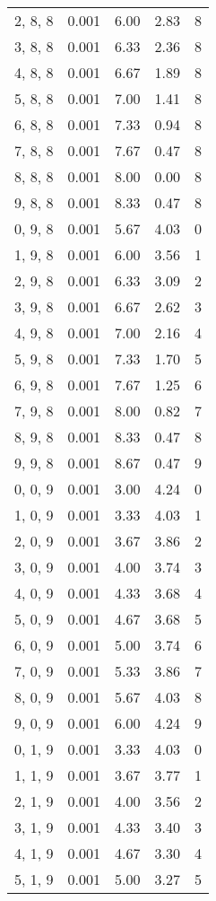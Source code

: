 \documentclass[12pt]{article}
\begin{document}
\begin{tabular}{c || c || c | c | c}
2, 8, 8 & 0.001 & 6.00 & 2.83 & 8 \\
3, 8, 8 & 0.001 & 6.33 & 2.36 & 8 \\
4, 8, 8 & 0.001 & 6.67 & 1.89 & 8 \\
5, 8, 8 & 0.001 & 7.00 & 1.41 & 8 \\
6, 8, 8 & 0.001 & 7.33 & 0.94 & 8 \\
7, 8, 8 & 0.001 & 7.67 & 0.47 & 8 \\
8, 8, 8 & 0.001 & 8.00 & 0.00 & 8 \\
9, 8, 8 & 0.001 & 8.33 & 0.47 & 8 \\
0, 9, 8 & 0.001 & 5.67 & 4.03 & 0 \\
1, 9, 8 & 0.001 & 6.00 & 3.56 & 1 \\
2, 9, 8 & 0.001 & 6.33 & 3.09 & 2 \\
3, 9, 8 & 0.001 & 6.67 & 2.62 & 3 \\
4, 9, 8 & 0.001 & 7.00 & 2.16 & 4 \\
5, 9, 8 & 0.001 & 7.33 & 1.70 & 5 \\
6, 9, 8 & 0.001 & 7.67 & 1.25 & 6 \\
7, 9, 8 & 0.001 & 8.00 & 0.82 & 7 \\
8, 9, 8 & 0.001 & 8.33 & 0.47 & 8 \\
9, 9, 8 & 0.001 & 8.67 & 0.47 & 9 \\
0, 0, 9 & 0.001 & 3.00 & 4.24 & 0 \\
1, 0, 9 & 0.001 & 3.33 & 4.03 & 1 \\
2, 0, 9 & 0.001 & 3.67 & 3.86 & 2 \\
3, 0, 9 & 0.001 & 4.00 & 3.74 & 3 \\
4, 0, 9 & 0.001 & 4.33 & 3.68 & 4 \\
5, 0, 9 & 0.001 & 4.67 & 3.68 & 5 \\
6, 0, 9 & 0.001 & 5.00 & 3.74 & 6 \\
7, 0, 9 & 0.001 & 5.33 & 3.86 & 7 \\
8, 0, 9 & 0.001 & 5.67 & 4.03 & 8 \\
9, 0, 9 & 0.001 & 6.00 & 4.24 & 9 \\
0, 1, 9 & 0.001 & 3.33 & 4.03 & 0 \\
1, 1, 9 & 0.001 & 3.67 & 3.77 & 1 \\
2, 1, 9 & 0.001 & 4.00 & 3.56 & 2 \\
3, 1, 9 & 0.001 & 4.33 & 3.40 & 3 \\
4, 1, 9 & 0.001 & 4.67 & 3.30 & 4 \\
5, 1, 9 & 0.001 & 5.00 & 3.27 & 5 \\

\end{tabular}
\end{document}
